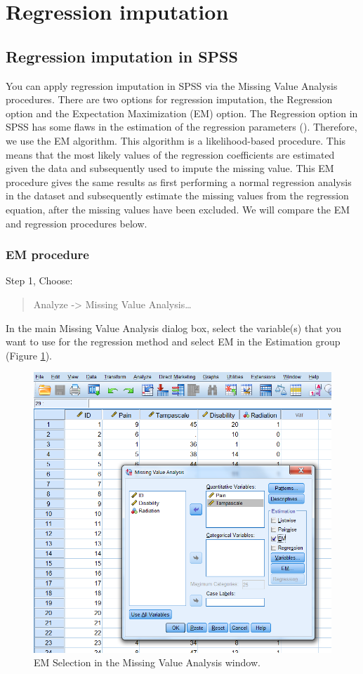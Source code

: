 \documentclass[]{book}
\begin{document}
\section{Regression imputation}\label{regression-imputation}

\subsection{Regression imputation in
SPSS}\label{regression-imputation-in-spss}

You can apply regression imputation in SPSS via the Missing Value
Analysis procedures. There are two options for regression imputation,
the Regression option and the Expectation Maximization (EM) option. The
Regression option in SPSS has some flaws in the estimation of the
regression parameters (\citet{hippel1}). Therefore, we use the EM
algorithm. This algorithm is a likelihood-based procedure. This means
that the most likely values of the regression coefficients are estimated
given the data and subsequently used to impute the missing value. This
EM procedure gives the same results as first performing a normal
regression analysis in the dataset and subsequently estimate the missing
values from the regression equation, after the missing values have been
excluded. We will compare the EM and regression procedures below.

\subsubsection{EM procedure}\label{em-procedure}

Step 1, Choose:

\begin{quote}
Analyze -\textgreater{} Missing Value Analysis\ldots{}
\end{quote}

In the main Missing Value Analysis dialog box, select the variable(s)
that you want to use for the regression method and select EM in the
Estimation group (Figure \ref{fig:fig3-10}).

\begin{figure}

{\centering \includegraphics[width=0.7\linewidth]{images/fig3.10} 

}

\caption{EM Selection in the Missing Value Analysis window.}\label{fig:fig3-10}
\end{figure}
\end{document}
